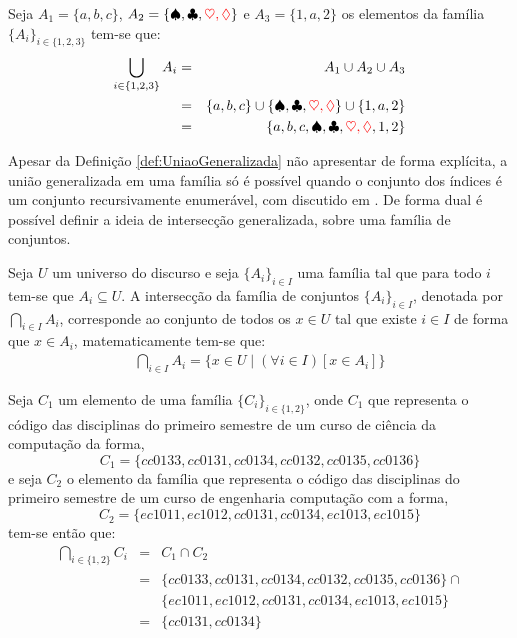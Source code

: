 \begin{exemplo}\label{exe:UniaoGeneralizada1}
	Seja $A_1 = \{a, b, c\}$, $A_2 = \{\spadesuit, \clubsuit, {\color{red} \heartsuit, \lozenge}\}$ e $A_3 = \{1, a, 2\}$ os elementos da família $\{A_i\}_{i \in \{1, 2, 3\}}$ tem-se que:
	\begin{eqnarray*}
		\bigcup_{i \in \{1, 2, 3\}} A_i & = & A_1 \cup A_2 \cup A_3\\
		& = & \{a, b, c\} \cup \{\spadesuit, \clubsuit, {\color{red} \heartsuit, \lozenge}\} \cup \{1, a, 2\}\\
		& = & \{a, b, c, \spadesuit, \clubsuit, {\color{red} \heartsuit, \lozenge}, 1, 2\}
	\end{eqnarray*}
\end{exemplo}

Apesar da Definição \ref{def:UniaoGeneralizada} não apresentar de forma explícita, a união generalizada em uma família só é possível quando o conjunto dos índices é um conjunto recursivamente enumerável, com discutido em \cite{carmo2013}. De forma dual é possível definir a ideia de intersecção generalizada, sobre uma família de conjuntos.

\begin{definicao}\label{def:IntersecaoGeneralizada}
	Seja $U$ um universo do discurso e seja $\{{A_i}\}_{i \in I}$ uma família tal que para todo $i$ tem-se que $A_i \subseteq U$. A intersecção da família de conjuntos $\{{A_i}\}_{i \in I}$, denotada por $\bigcap_{i \in I} A_i$, corresponde ao conjunto de todos os $x \in U$ tal que existe $i \in I$ de forma que $x \in A_i$, matematicamente tem-se que:
	\begin{eqnarray*}
		\bigcap_{i \in I} A_i = \{x \in U \mid (\forall i \in I)[x \in A_i]\}
	\end{eqnarray*}
\end{definicao}

\begin{exemplo}\label{exe:IntersecaoGeneralizada1}
	Seja $C_1$ um elemento de uma família $\{C_i\}_{i \in \{1, 2\}}$, onde $C_1$ que representa o código das disciplinas do primeiro semestre de um curso de ciência da computação da forma,
	$$C_1 = \{cc0133, cc0131, cc0134, cc0132, cc0135, cc0136\}$$ 
	e seja $C_2$ o elemento da família que representa o código das disciplinas do primeiro semestre de um curso de engenharia computação com a forma,
	$$C_2 = \{ec1011, ec1012, cc0131, cc0134, ec1013, ec1015\}$$ 
	tem-se então que:
	\begin{eqnarray*}
		\bigcap_{i \in \{1, 2\}} C_i & = & C_1 \cap C_2\\
		& = & \{cc0133, cc0131, cc0134, cc0132, cc0135, cc0136\} \cap\\
		&   & \{ec1011, ec1012, cc0131, cc0134, ec1013, ec1015\}\\
		& = & \{cc0131, cc0134\}
	\end{eqnarray*}
\end{exemplo}





